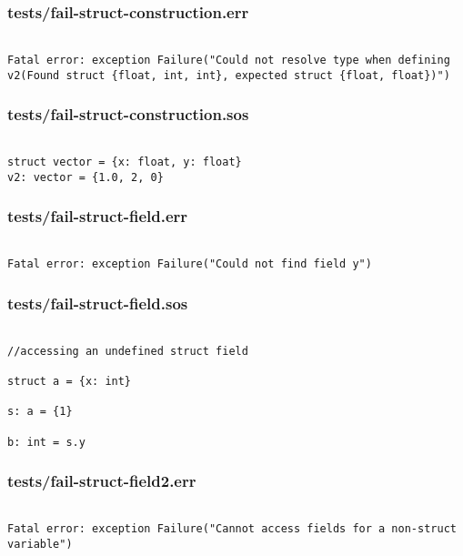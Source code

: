 \documentclass[main.tex]{subfiles}
\begin{document}
\subsubsection{tests/fail-struct-construction.err}

\begin{lstlisting}

Fatal error: exception Failure("Could not resolve type when defining v2(Found struct {float, int, int}, expected struct {float, float})")
\end{lstlisting}

\subsubsection{tests/fail-struct-construction.sos}

\begin{lstlisting}

struct vector = {x: float, y: float}
v2: vector = {1.0, 2, 0}
\end{lstlisting}

\subsubsection{tests/fail-struct-field.err}

\begin{lstlisting}

Fatal error: exception Failure("Could not find field y")
\end{lstlisting}

\subsubsection{tests/fail-struct-field.sos}

\begin{lstlisting}

//accessing an undefined struct field

struct a = {x: int}

s: a = {1}

b: int = s.y
\end{lstlisting}

\subsubsection{tests/fail-struct-field2.err}

\begin{lstlisting}

Fatal error: exception Failure("Cannot access fields for a non-struct variable")
\end{lstlisting}
\end{document}
